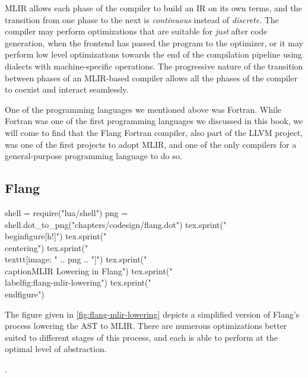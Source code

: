 MLIR allows each phase of the compiler to build an IR on its own terms,
and the transition from one phase to the next is \textit{continuous}
instead of \textit{discrete}.
The compiler may perform optimizations that are suitable for \textit{just} after
code generation, when the frontend has passed the program to the optimizer,
or it may perform low level optimizations towards the end of the compilation
pipeline using dialects with machine-specific operations.
The progressive nature of the transition between phases of an MLIR-based compiler
allows all the phases of the compiler to coexist and interact seamlessly.

One of the programming languages we mentioned above was Fortran.
While Fortran was one of the first programming languages we discussed in this book,
we will come to find that the Flang Fortran compiler, also part of the LLVM project,
was one of the first projects to adopt MLIR, and one of the only compilers for a
general-purpose programming language to do so.

\subsection{Flang}

\begin{luacode*}
	shell = require("lua/shell")
	png = shell.dot_to_png("chapters/codesign/flang.dot")
	tex.sprint("\\begin{figure}[h!]")
		tex.sprint("\\centering")
		tex.sprint("\\texttt{[image: " .. png .. "]}")
		tex.sprint("\\caption{MLIR Lowering in Flang}")
		tex.sprint("\\label{fig:flang-mlir-lowering}")
		tex.sprint("\\end{figure}")
\end{luacode*}

The figure given in \ref{fig:flang-mlir-lowering} depicts a simplified version of
Flang's process lowering the AST to MLIR.
There are numerous optimizations better suited to different stages of this
process, and each is able to perform at the optimal level of abstraction.

.
